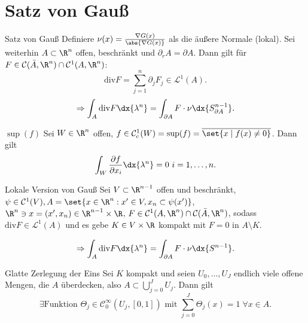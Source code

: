 \section*{Satz von Gauß}

\begin{karte}{Satz von Gauß}
    Definiere \( \nu(x) = \frac{\nabla G(x)}{\abs{\nabla G(x)}} \) als die 
    äußere Normale (lokal). Sei weiterhin \( A \subset \R^n \) offen, beschränkt und 
    \( \partial_r A = \partial A \). Dann gilt für \(F \in \mathcal{C}(\bar{A}, \R^n) \cap \mathcal{C}^1(A, \R^n)\):
    \[ \mathrm{div} F = \sum_{j=1}^n \partial_j F_j \in \mathcal{L}^1(A). \]
    \[ \Rightarrow \int_A \mathrm{div} F \dx{\lambda^n} = \int_{\partial A} F \cdot \nu \dx{S_{\partial A}^{n-1}}. \]
\end{karte}

\begin{karte}{\( \sup(f) \)}
    Sei \( W\in \R^n \) offen, \(f \in \mathcal{C}_c^1(W) = \sup(f) = \overline{\set{x\;|\;f(x) \neq 0}} \). Dann gilt 
    \[ \int_W \frac{\partial f}{\partial x_i} \dx{\lambda^n} = 0 \ i=1,\ldots, n. \]
\end{karte}

\begin{karte}{Lokale Version von Gauß}
    Sei \(V \subset \R^{n-1}\) offen und beschränkt, 
    \( \psi \in \mathcal{C}^1(V), A = \set{x\in \R^n : x'\in V, x_n \subset \psi(x') } \), 
    \(\R^n \ni x = (x', x_n) \in \R^{n-1}\times \R \), 
    \( F \in \mathcal{C}^1(A, \R^n) \cap \mathcal{C}(\bar{A}, \R^n) \), sodass 
    \( \mathrm{div} F \in \mathcal{L}^1(A) \) und es gebe \(K \in V \times \R\) kompakt mit 
    \(F = 0\) in \(A \setminus K\).

    \[ \Rightarrow \int_A \mathrm{div} F \dx{\lambda^n} = \int_{\partial A} F \cdot \nu \dx{S^{n-1}}. \]
\end{karte}

\begin{karte}{Glatte Zerlegung der Eins}
    Sei \(K\) kompakt und seien \( U_0,\ldots, U_J \) endlich viele offene Mengen, 
    die \(A\) überdecken, also \( A \subset \bigcup_{j=0}^J U_j \). Dann gilt 
    \[ \exists \text{Funktion } \Theta_j \in \mathcal{C}^\infty_0(U_j, [0,1]) \text{ mit } \sum_{j=0}^J \Theta_j(x) = 1 \;\forall x\in A. \]
\end{karte}